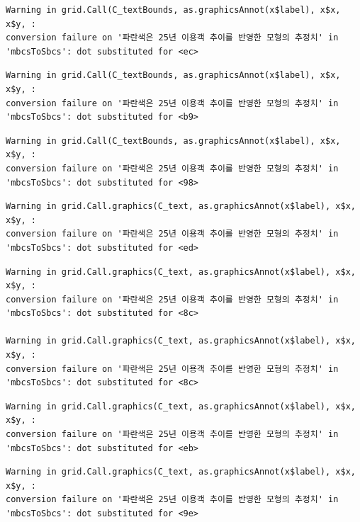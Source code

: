 \documentclass[
  letterpaper,
  DIV=11,
  numbers=noendperiod]{scrreprt}
\begin{document}
\begin{verbatim}
Warning in grid.Call(C_textBounds, as.graphicsAnnot(x$label), x$x, x$y, :
conversion failure on '파란색은 25년 이용객 추이를 반영한 모형의 추정치' in
'mbcsToSbcs': dot substituted for <ec>
\end{verbatim}

\begin{verbatim}
Warning in grid.Call(C_textBounds, as.graphicsAnnot(x$label), x$x, x$y, :
conversion failure on '파란색은 25년 이용객 추이를 반영한 모형의 추정치' in
'mbcsToSbcs': dot substituted for <b9>
\end{verbatim}

\begin{verbatim}
Warning in grid.Call(C_textBounds, as.graphicsAnnot(x$label), x$x, x$y, :
conversion failure on '파란색은 25년 이용객 추이를 반영한 모형의 추정치' in
'mbcsToSbcs': dot substituted for <98>
\end{verbatim}

\begin{verbatim}
Warning in grid.Call.graphics(C_text, as.graphicsAnnot(x$label), x$x, x$y, :
conversion failure on '파란색은 25년 이용객 추이를 반영한 모형의 추정치' in
'mbcsToSbcs': dot substituted for <ed>
\end{verbatim}

\begin{verbatim}
Warning in grid.Call.graphics(C_text, as.graphicsAnnot(x$label), x$x, x$y, :
conversion failure on '파란색은 25년 이용객 추이를 반영한 모형의 추정치' in
'mbcsToSbcs': dot substituted for <8c>

Warning in grid.Call.graphics(C_text, as.graphicsAnnot(x$label), x$x, x$y, :
conversion failure on '파란색은 25년 이용객 추이를 반영한 모형의 추정치' in
'mbcsToSbcs': dot substituted for <8c>
\end{verbatim}

\begin{verbatim}
Warning in grid.Call.graphics(C_text, as.graphicsAnnot(x$label), x$x, x$y, :
conversion failure on '파란색은 25년 이용객 추이를 반영한 모형의 추정치' in
'mbcsToSbcs': dot substituted for <eb>
\end{verbatim}

\begin{verbatim}
Warning in grid.Call.graphics(C_text, as.graphicsAnnot(x$label), x$x, x$y, :
conversion failure on '파란색은 25년 이용객 추이를 반영한 모형의 추정치' in
'mbcsToSbcs': dot substituted for <9e>
\end{verbatim}
\end{document}
